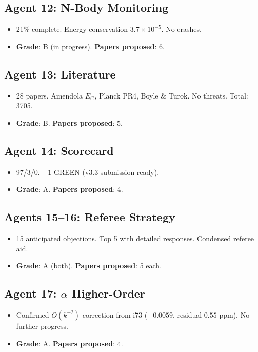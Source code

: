 \documentclass[11pt,a4paper]{article}
\begin{document}
\subsection{Agent 12: N-Body Monitoring}
\begin{itemize}[nosep]
\item 21\% complete. Energy conservation $3.7 \times 10^{-5}$. No crashes.
\item \textbf{Grade}: B (in progress). \textbf{Papers proposed}: 6.
\end{itemize}

\subsection{Agent 13: Literature}
\begin{itemize}[nosep]
\item 28 papers. Amendola $E_G$, Planck PR4, Boyle \& Turok. No threats. Total: 3705.
\item \textbf{Grade}: B. \textbf{Papers proposed}: 5.
\end{itemize}

\subsection{Agent 14: Scorecard}
\begin{itemize}[nosep]
\item 97/3/0. $+1$ GREEN (v3.3 submission-ready).
\item \textbf{Grade}: A. \textbf{Papers proposed}: 4.
\end{itemize}

\subsection{Agents 15--16: Referee Strategy}
\begin{itemize}[nosep]
\item 15 anticipated objections. Top 5 with detailed responses. Condensed referee aid.
\item \textbf{Grade}: A (both). \textbf{Papers proposed}: 5 each.
\end{itemize}

\subsection{Agent 17: $\alpha$ Higher-Order}
\begin{itemize}[nosep]
\item Confirmed $O(k^{-2})$ correction from i73 ($-0.0059$, residual $0.55$ ppm). No further progress.
\item \textbf{Grade}: A. \textbf{Papers proposed}: 4.
\end{itemize}
\end{document}
